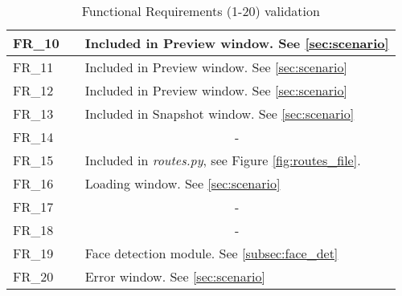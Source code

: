 \begin{table}[p]
{\begin{tabular}{| C{2cm} | C{3cm} | L{9cm} |}
	    \hline
	    FR{\_}10 & \checkmark & Included in Preview window. See \ref{sec:scenario} \\
	    \hline
	    FR{\_}11 & \checkmark & Included in Preview window. See \ref{sec:scenario} \\
	    \hline
	    FR{\_}12 & \checkmark & Included in Preview window. See \ref{sec:scenario} \\
	    \hline
	    FR{\_}13 & \checkmark & Included in Snapshot window. See \ref{sec:scenario} \\
	    \hline
	    FR{\_}14 & \checkmark &  \\
	    \hline
	    FR{\_}15 & \checkmark & Included in \textit{routes.py}, see Figure \ref{fig:routes_file}. \\
	    \hline
	    FR{\_}16 & \checkmark & Loading window. See \ref{sec:scenario}  \\
	    \hline
	    FR{\_}17 & \checkmark &  \\
	    \hline
	    FR{\_}18 & \checkmark &  \\
	    \hline
	    FR{\_}19 & \checkmark & Face detection module. See \ref{subsec:face_det} \\
	    \hline
	    FR{\_}20 & \checkmark & Error window. See \ref{sec:scenario} \\
	    \hline
	\end{tabular}	    
	}
	\caption{Functional Requirements (1-20) validation}
    \label{table:fun_1_req_validation}
\end{table}

